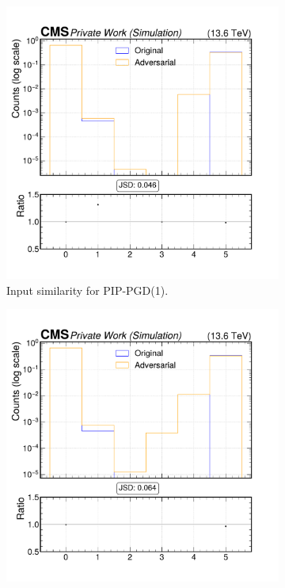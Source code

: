 \begin{figure}[h]
  \centering
  \begin{subfigure}[t]{0.32\textwidth}
    \includegraphics[width=\linewidth]{media/output/features/compare/combined_it_1/cmp_cpf_arr_Cpfcan_quality.pdf}
    \caption*{Input similarity for PIP-PGD(1).}
  \end{subfigure}\hfill
  \begin{subfigure}[t]{0.32\textwidth}
    \includegraphics[width=\linewidth]{media/output/features/compare/combined_it_2/cmp_cpf_arr_Cpfcan_quality.pdf}

\end{subfigure}
\end{figure}
